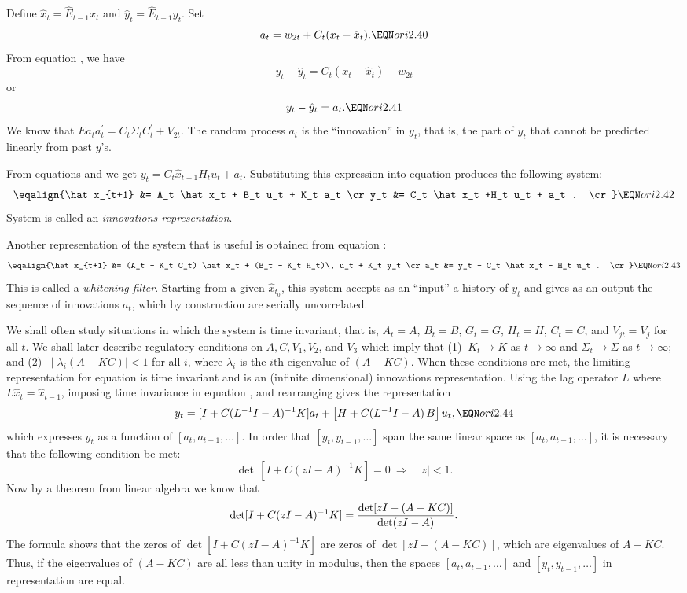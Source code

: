 Define $\hat x_t = \widehat E_{t-1}x_t$ and $\hat y_t =
\widehat E_{t-1} y_t$.  Set
$$a_t=w_{2t} + C_t(x_t-\hat x_t) . \EQN ori2.40$$
From equation , we have
$$y_t - \hat y_t = C_t (x_t - \hat x_t) + w_{2t}$$
or
$$y_t - \hat y_t = a_t .\EQN ori2.41$$
We know that $E a_t a_t^\prime = C_t \Sigma_t C_t^\prime + V_{2t}$.  The
random process $a_t$ is the ``innovation'' in $y_t$, that is, the part of
$y_t$ that cannot be predicted linearly from past $y$'s.

From equations  and  we get $y_t=C_t \hat x_{t+1}
H_t u_t+a_t$.  Substituting this expression into equation  produces the
following system:
$$\eqalign{\hat x_{t+1} &= A_t \hat x_t + B_t u_t + K_t a_t \cr
y_t &= C_t \hat x_t +H_t u_t + a_t . \cr}\EQN ori2.42$$
System  is called an {\it innovations representation}.

Another representation of the system that is useful is obtained from
equation :
$$\eqalign{\hat x_{t+1} &= (A_t - K_t C_t) \hat x_t + (B_t - K_t H_t)\, u_t
+ K_t y_t \cr
a_t &= y_t - C_t \hat x_t - H_t u_t . \cr} \EQN ori2.43$$
This is called a {\it whitening filter}.  Starting from a given $\hat x_{t_0}$,
this system accepts as an ``input'' a history of $y_t$ and gives as an output
the sequence of innovations $a_t$, which by construction are serially
uncorrelated.

We shall often study situations in which the system is time invariant, that is,
$A_t = A,\, B_t=B,\, G_t=G,\, H_t=H,\, C_t = C$, and $V_{jt} = V_j$ for all $t$.
We shall later describe
regulatory conditions on $A, C, V_1, V_2$, and $V_3$ which imply that (1) $\ K_t
\rightarrow K$ as $t \rightarrow \infty$ and $\Sigma_t \rightarrow \Sigma$ as
$t\rightarrow \infty$; and (2) $ \ \mid \lambda_i (A - KC) \mid < 1$ for all
$i$, where $\lambda_i$ is the $i$th eigenvalue of $(A - KC)$.  When these
conditions are met, the limiting representation for equation  is time
invariant and is an (infinite dimensional) innovations representation.
Using the lag operator $L$ where $L \hat x_t = \hat x_{t-1}$, imposing
time invariance in equation , and rearranging gives the representation
$$y_t = [I + C (L^{-1} I - A)^{-1} K] a_t +\bigl[ H+C (L^{-1} I-A)\,B\bigr]\,
u_t, \EQN ori2.44$$
which expresses $y_t$ as a function of $[a_t, a_{t-1}, \ldots]$.  In
order that $[y_t, y_{t-1},
\ldots]$ span the same linear space as $[a_t, a_{t-1}, \ldots]$,
it is necessary that the following condition be met:
$$\det\, [I + C (zI - A)^{-1} K] = 0 \ \Rightarrow \ \mid z \mid < 1 .$$
Now by a theorem from linear algebra we know that
  
%
$$\det [I + C (zI-A)^{-1} K] = {\det [zI - (A-KC)] \over \det (zI-A)} .$$
The formula shows that the zeros of $\det [I + C (zI-A)^{-1} K]$ are
zeros of $\det [zI - (A - KC)]$, which are eigenvalues of $A - KC$.  Thus,
if the eigenvalues of $(A-KC)$ are all less than unity in modulus, then the
spaces $[a_t, a_{t-1}, \ldots]$ and $[y_t, y_{t-1}, \ldots]$ in
representation  are equal.

